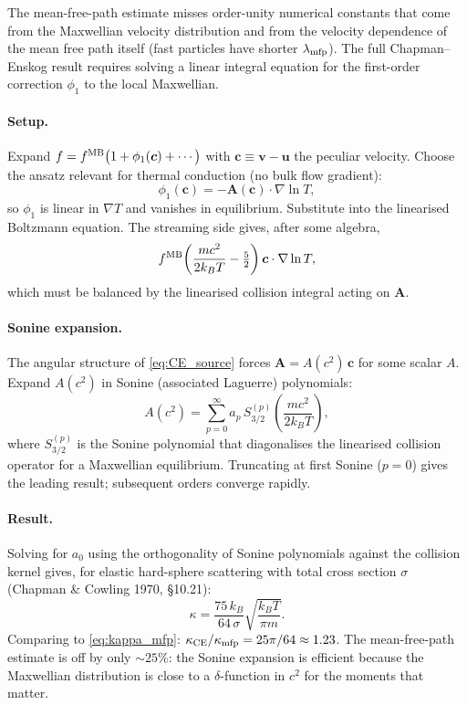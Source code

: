 \documentclass[12pt]{article}
\renewcommand{\vec}[1]{\bm{#1}}
\begin{document}
The mean-free-path estimate misses order-unity numerical constants
that come from the Maxwellian velocity distribution and from the
velocity dependence of the mean free path itself (fast particles have
shorter $\lambda_{\rm mfp}$).  The full Chapman--Enskog result
requires solving a linear integral equation for the first-order
correction $\phi_1$ to the local Maxwellian.

\paragraph{Setup.}  Expand
$f = f^{\rm MB}\bigl(1 + \phi_1(\vec c) + \cdots\bigr)$
with $\vec c \equiv \vec v - \vec u$ the peculiar velocity.  Choose
the ansatz relevant for thermal conduction (no bulk flow gradient):
%
\begin{equation}
  \phi_1(\vec c) = -\vec A(\vec c)\cdot\nabla\ln T,
\end{equation}
%
so $\phi_1$ is linear in $\nabla T$ and vanishes in equilibrium.
Substitute into the linearised Boltzmann equation.  The streaming
side gives, after some algebra,
%
\begin{equation}
  f^{\rm MB}\!\left(\frac{mc^2}{2 k_B T} - \tfrac{5}{2}\right)\vec c\cdot\nabla\ln T,
  \label{eq:CE_source}
\end{equation}
%
which must be balanced by the linearised collision integral acting on
$\vec A$.

\paragraph{Sonine expansion.}  The angular structure of \eqref{eq:CE_source}
forces $\vec A = A(c^2)\,\vec c$ for some scalar $A$.  Expand $A(c^2)$
in Sonine (associated Laguerre) polynomials:
%
\begin{equation}
  A(c^2) = \sum_{p=0}^\infty a_p\,S_{3/2}^{(p)}\!\!\left(\frac{mc^2}{2k_B T}\right)\!,
\end{equation}
%
where $S_{3/2}^{(p)}$ is the Sonine polynomial that diagonalises the
linearised collision operator for a Maxwellian equilibrium.
Truncating at first Sonine ($p=0$) gives the leading result;
subsequent orders converge rapidly.

\paragraph{Result.}  Solving for $a_0$ using the orthogonality of
Sonine polynomials against the collision kernel gives, for elastic
hard-sphere scattering with total cross section $\sigma$
(Chapman \& Cowling 1970, \S 10.21):
%
\begin{equation}
  \kappa = \frac{75\,k_B}{64\,\sigma}\sqrt{\frac{k_B T}{\pi m}}.
  \label{eq:kappa_CE_full}
\end{equation}
%
Comparing to \eqref{eq:kappa_mfp}:
$\kappa_{\rm CE}/\kappa_{\rm mfp} = 25\pi/64 \approx 1.23$.  The
mean-free-path estimate is off by only $\sim 25\%$: the Sonine
expansion is efficient because the Maxwellian distribution is close
to a $\delta$-function in $c^2$ for the moments that matter.
\end{document}

